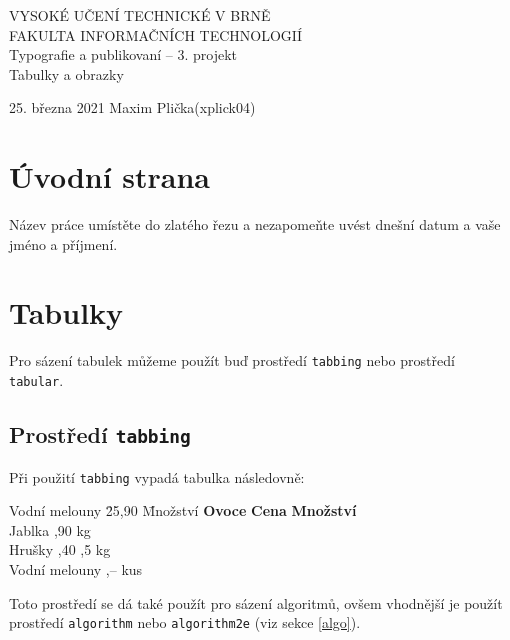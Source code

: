 \documentclass[a4paper,11pt]{article}
\begin{document}
\begin{titlepage}
\begin{center}
\huge
\textsc{VYSOKÉ UČENÍ TECHNICKÉ V BRNĚ \\
FAKULTA INFORMAČNÍCH TECHNOLOGIÍ
}
\\
\large
Typografie a publikovaní – 3. projekt \\
\LARGE
Tabulky a obrazky
\end{center}
{\Large 25. března 2021 \hfill
Maxim Plička(xplick04)}
\end{titlepage}

\section{Úvodní strana}
Název práce umístěte do zlatého řezu a nezapomeňte uvést dnešní datum a vaše jméno a příjmení.
\section{Tabulky}
Pro sázení tabulek můžeme použít buď prostředí \texttt{tabbing} nebo prostředí \texttt{tabular}.

\subsection{Prostředí \texttt{tabbing}}
Při použití \texttt{tabbing} vypadá tabulka následovně:

 \begin{tabbing}
    Vodní melouny \quad \= 25,90 \quad	\= Množství \kill
    \textbf{Ovoce} \quad \> \textbf{Cena} \quad \> \textbf{Množství}  \quad \\
    Jablka ,90  kg \\
    Hrušky ,40  ,5 kg \\
    Vodní melouny ,–  kus \\
  \end{tabbing}
Toto prostředí se dá také použít pro sázení algoritmů, ovšem vhodnější je použít 
prostředí \texttt{algorithm} nebo \texttt{algorithm2e} (viz sekce \ref{algo}).
\end{document}
